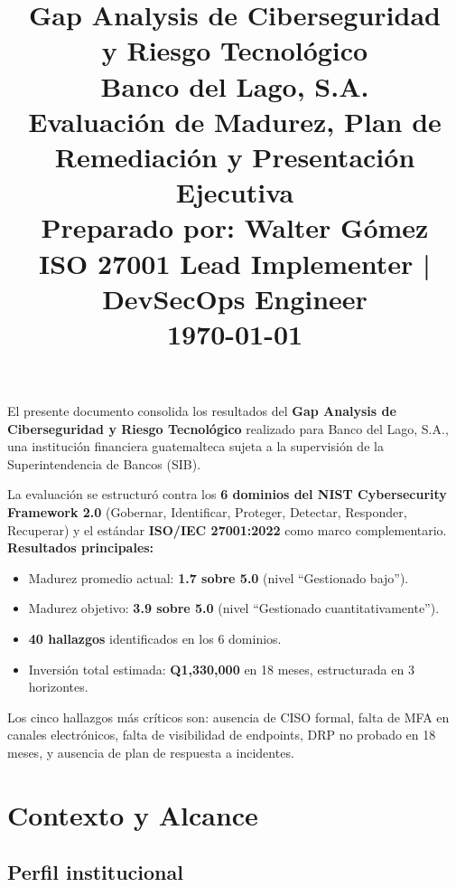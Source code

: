 \documentclass[11pt,a4paper]{article}
\title{
	\vspace{-1.5cm}
	\textbf{\Huge Gap Analysis de Ciberseguridad}\\[0.3cm]
	\textbf{\Huge y Riesgo Tecnológico}\\[0.5cm]
	\Large Banco del Lago, S.A.\\[0.3cm]
	\large Evaluación de Madurez, Plan de Remediación y Presentación Ejecutiva\\[0.5cm]
	\normalsize Preparado por: Walter Gómez\\
	\normalsize ISO 27001 Lead Implementer | DevSecOps Engineer\\
	\normalsize \today
}
\date{}
\begin{document}
	
	\maketitle
	\thispagestyle{empty}
	
	\begin{infobox}
		El presente documento consolida los resultados del \textbf{Gap Analysis de Ciberseguridad y Riesgo Tecnológico} realizado para Banco del Lago, S.A., una institución financiera guatemalteca sujeta a la supervisión de la Superintendencia de Bancos (SIB).
		
		La evaluación se estructuró contra los \textbf{6 dominios del NIST Cybersecurity Framework 2.0} (Gobernar, Identificar, Proteger, Detectar, Responder, Recuperar) y el estándar \textbf{ISO/IEC 27001:2022} como marco complementario. \\
		
		\textbf{Resultados principales:}
		\begin{itemize}[leftmargin=1.5em]
			\item Madurez promedio actual: \textbf{1.7 sobre 5.0} (nivel ``Gestionado bajo'').
			\item Madurez objetivo: \textbf{3.9 sobre 5.0} (nivel ``Gestionado cuantitativamente'').
			\item \textbf{40 hallazgos} identificados en los 6 dominios.
			\item Inversión total estimada: \textbf{Q1,330,000} en 18 meses, estructurada en 3 horizontes.
		\end{itemize}
		
		Los cinco hallazgos más críticos son: ausencia de CISO formal, falta de MFA en canales electrónicos, falta de visibilidad de endpoints, DRP no probado en 18 meses, y ausencia de plan de respuesta a incidentes.
	\end{infobox}
	
	\vspace{0.5cm}
	
	\tableofcontents
	
	\newpage
	
	
	\section{Contexto y Alcance}
	
	\subsection{Perfil institucional}
	
\end{document}
